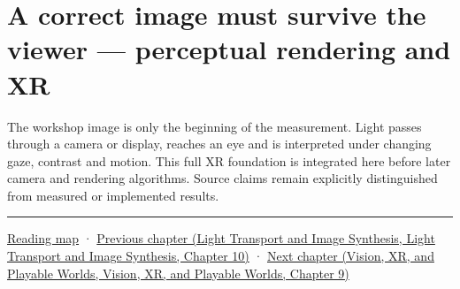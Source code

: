\section{A correct image must survive the viewer --- perceptual rendering and XR}\label{04-visual-computing-ii-ch041-a-correct-image-must-survive-the-viewer-perceptual-rendering-and-xr}

The workshop image is only the beginning of the measurement. Light passes through a camera or display, reaches an eye and is interpreted under changing gaze, contrast and motion. This full XR foundation is integrated here before later camera and rendering algorithms. Source claims remain explicitly distinguished from measured or implemented results.

\begin{center}\rule{0.5\linewidth}{0.5pt}\end{center}

\hyperref[volume-reading-map]{Reading map} · \href{../04-Light-Transport-and-Image-Synthesis/main.pdf\#nameddest=04-visual-computing-ii-ch040-lighting-reconstruction-and-surface-motion}{Previous chapter (Light Transport and Image Synthesis, Light Transport and Image Synthesis, Chapter 10)} · \href{../07-Vision-XR-and-Playable-Worlds/main.pdf\#nameddest=04-visual-computing-ii-ch042-xr-radiometry-optics-and-perception}{Next chapter (Vision, XR, and Playable Worlds, Vision, XR, and Playable Worlds, Chapter 9)}
